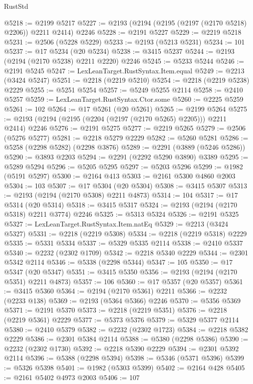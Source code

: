 \begin{lexlean}{RustStd}
\begin{coremodule}
@5218 := @2199 @5217
@5227 := @2193 (@2194 (@2195 (@2197 (@2170 @5218) @2206)) @2211 @2414) @2246
@5228 := @2191 @5227
@5229 := @2219 @5218
@5231 := @2506 (@5228 @5229)
@5233 := @2193 (@5213 @5231)
@5234 := 101
@5237 := @17 @5234 (@20 @5234)
@5238 := @3415 @5237
@5244 := @2193 (@2194 (@2170 @5238) @2211 @2220) @2246
@5245 := @5233 @5244
@5246 := @2191 @5245
@5247 := LexLeanTarget.RustSyntax.Item.equal
@5249 := @2213 (@3424 @5247)
@5251 := @2218 (@2219 @5210)
@5254 := @2218 (@2219 @5238) @2229
@5255 := @5251 @5254
@5257 := @5249 @5255 @2114
@5258 := @2410 @5257
@5259 := LexLeanTarget.RustSyntax.Ctor.some
@5260 := @2225 @5259
@5261 := 102
@5264 := @17 @5261 (@20 @5261)
@5265 := @2199 @5264
@5275 := @2193 (@2194 (@2195 (@2204 (@2197 (@2170 @5265) @2205))) @2211 @2414) @2246
@5276 := @2191 @5275
@5277 := @2219 @5265
@5279 := @2506 (@5276 @5277)
@5281 := @2218 @5279 @2229
@5282 := @5260 @5281
@5286 := @5258 (@2298 @5282) (@2298 @3876)
@5289 := @2291 (@3889 (@5246 @5286))
@5290 := @3893 @2203
@5294 := @2291 (@2292 @5290 @3890) @3389
@5295 := @5289 @5294
@5296 := @5205 @5295
@5297 := @5203 @5296
@5299 := @1982 (@5191 @5297)
@5300 := @2164 @413
@5303 := @2161 @5300 @4860 @2003
@5304 := 103
@5307 := @17 @5304 (@20 @5304)
@5308 := @3415 @5307
@5313 := @2193 (@2194 (@2170 @5308) @2211 @4873)
@5314 := 104
@5317 := @17 @5314 (@20 @5314)
@5318 := @3415 @5317
@5324 := @2193 (@2194 (@2170 @5318) @2211 @3774) @2246
@5325 := @5313 @5324
@5326 := @2191 @5325
@5327 := LexLeanTarget.RustSyntax.Item.natEq
@5329 := @2213 (@3424 @5327)
@5331 := @2218 (@2219 @5308)
@5334 := @2218 (@2219 @5318) @2229
@5335 := @5331 @5334
@5337 := @5329 @5335 @2114
@5338 := @2410 @5337
@5340 := @2232 (@2302 @1709)
@5342 := @2218 @5340 @2229
@5344 := @2301 @5342 @2114
@5346 := @5338 (@2298 @5344)
@5347 := 105
@5350 := @17 @5347 (@20 @5347)
@5351 := @3415 @5350
@5356 := @2193 (@2194 (@2170 @5351) @2211 @4873)
@5357 := 106
@5360 := @17 @5357 (@20 @5357)
@5361 := @3415 @5360
@5364 := @2194 (@2170 @5361) @2211
@5366 := @2232 (@2233 @138)
@5369 := @2193 (@5364 @5366) @2246
@5370 := @5356 @5369
@5371 := @2191 @5370
@5373 := @2218 (@2219 @5351)
@5376 := @2218 (@2219 @5361) @2229
@5377 := @5373 @5376
@5379 := @5329 @5377 @2114
@5380 := @2410 @5379
@5382 := @2232 (@2302 @1723)
@5384 := @2218 @5382 @2229
@5386 := @2301 @5384 @2114
@5388 := @5380 (@2298 @5386)
@5390 := @2232 (@2302 @1730)
@5392 := @2218 @5390 @2229
@5394 := @2301 @5392 @2114
@5396 := @5388 (@2298 @5394)
@5398 := @5346 (@5371 @5396)
@5399 := @5326 @5398
@5401 := @1982 (@5303 @5399)
@5402 := @2164 @428
@5405 := @2161 @5402 @4973 @2003
@5406 := 107

\end{coremodule}
\end{lexlean}
